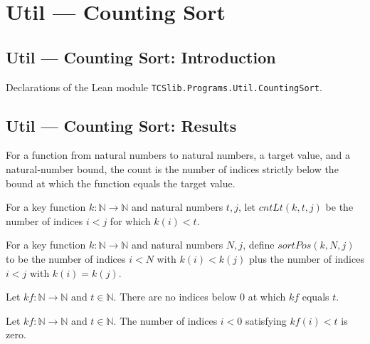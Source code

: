 \section{Util --- Counting Sort}
\subsection*{Util --- Counting Sort: Introduction}

Declarations of the Lean module \texttt{TCSlib.Programs.Util.CountingSort}.

\subsection*{Util --- Counting Sort: Results}

\begin{definition}
\label{Light.cntEq}
\leanok
For a function from natural numbers to natural numbers, a target value, and a
natural-number bound, the count is the number of indices strictly below the bound at
which the function equals the target value.
\end{definition}

\begin{definition}
\label{Light.cntLt}
\leanok
For a key function $k:\mathbb{N}\to\mathbb{N}$ and natural numbers $t,j$, let $cntLt(k,t,j)$
be the number of indices $i<j$ for which $k(i)<t$.
\end{definition}

\begin{definition}
\label{Light.sortPos}
\leanok
{}
For a key function $k:\mathbb{N}\to\mathbb{N}$ and natural numbers $N,j$, define
$sortPos(k,N,j)$ to be the number of indices $i<N$ with $k(i)<k(j)$ plus the number
of indices $i<j$ with $k(i)=k(j)$.
\end{definition}

\begin{theorem}
\label{Light.cntEq_zero}
\leanok
{}
Let $kf:\mathbb{N}\to\mathbb{N}$ and $t\in\mathbb{N}$. There are no indices below $0$ at
which $kf$ equals $t$.
\end{theorem}

\begin{theorem}
\label{Light.cntLt_zero_right}
\leanok
{}
Let $kf:\mathbb{N}\to\mathbb{N}$ and $t\in\mathbb{N}$. The number of indices $i<0$
satisfying $kf(i)<t$ is zero.
\end{theorem}

